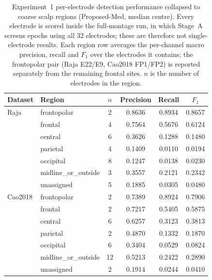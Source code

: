 \begin{table}[ht]
  \centering
  \caption{Experiment~1 per-electrode detection performance collapsed to coarse scalp regions (Proposed-Med, median centre). Every electrode is scored inside the full-montage run, in which Stage~A screens epochs using all 32 electrodes; these are therefore not single-electrode results. Each region row averages the per-channel macro precision, recall and $F_1$ over the electrodes it contains; the frontopolar pair (Raja E22/E9, Cao2018 FP1/FP2) is reported separately from the remaining frontal sites. $n$ is the number of electrodes in the region.}
  \label{tab:region_performance}
  \begin{tabular}{llcccc}
    \toprule
    Dataset & Region & $n$ & Precision & Recall & $F_1$ \\
    \midrule
    Raja & frontopolar & 2 & 0.8636 & 0.8934 & 0.8657 \\
     & frontal & 4 & 0.7564 & 0.5676 & 0.6124 \\
     & central & 6 & 0.3626 & 0.1288 & 0.1480 \\
     & parietal & 4 & 0.1409 & 0.0110 & 0.0194 \\
     & occipital & 8 & 0.1247 & 0.0138 & 0.0230 \\
     & midline\_or\_outside & 3 & 0.3557 & 0.2121 & 0.2342 \\
     & unassigned & 5 & 0.1885 & 0.0305 & 0.0480 \\
    \midrule
    Cao2018 & frontopolar & 2 & 0.7389 & 0.8924 & 0.7906 \\
     & frontal & 2 & 0.7217 & 0.5405 & 0.5875 \\
     & central & 6 & 0.6257 & 0.3123 & 0.3813 \\
     & parietal & 2 & 0.4870 & 0.1332 & 0.1870 \\
     & occipital & 6 & 0.3404 & 0.0529 & 0.0824 \\
     & midline\_or\_outside & 12 & 0.5213 & 0.2422 & 0.2890 \\
     & unassigned & 2 & 0.1914 & 0.0244 & 0.0410 \\
    \bottomrule
  \end{tabular}
\end{table}
